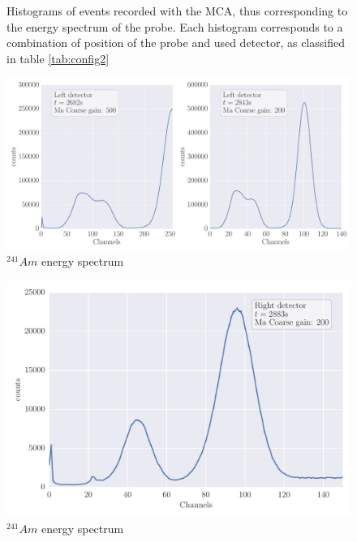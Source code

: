 \begin{figure}
\begin{subfigure}[b]{\picwidth}
        \caption{}
    \end{subfigure}
    \caption{
        Histograms of events recorded with the MCA, thus corresponding to the energy 
        spectrum of the probe. Each histogram corresponds to a combination of position 
        of the probe and used detector, as classified in table \ref{tab:config2}
        }
    \label{fig:measure2.1}
\end{figure}

\begin{figure}[htpb]
    \centering
    \includegraphics[width=\linewidth]{analysis/figures/plot6_12}
    \caption{$^{241}Am$ energy spectrum}
    \label{fig:plot6_13}
\end{figure}

\begin{figure}[htpb]
    \centering
    \includegraphics[width=0.8\linewidth]{analysis/figures/plot6_3}
    \caption{$^{241}Am$ energy spectrum}
    \label{fig:plot6_13}
\end{figure}




